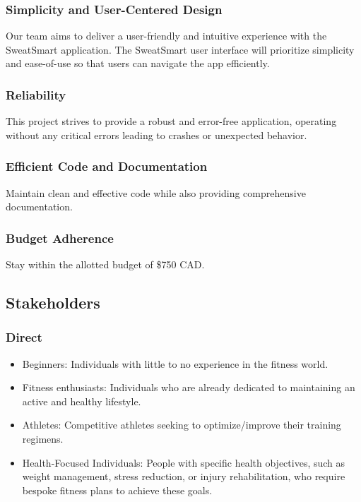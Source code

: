 \documentclass[12pt]{article}
\begin{document}
\subsubsection{Simplicity and User-Centered Design}
Our team aims to deliver a user-friendly and intuitive experience with the SweatSmart application. The SweatSmart user interface will prioritize simplicity and ease-of-use so that users can navigate the app efficiently.

\subsubsection{Reliability}
This project strives to provide a robust and error-free application, operating without any critical errors leading to crashes or unexpected behavior.

\subsubsection{Efficient Code and Documentation}
Maintain clean and effective code while also providing comprehensive documentation.

\subsubsection{Budget Adherence}
Stay within the allotted budget of \$750 CAD.

\subsection{Stakeholders}

\subsubsection{Direct}
\begin{itemize}
  \item Beginners: Individuals with little to no experience in the fitness world.
  \item Fitness enthusiasts: Individuals who are already dedicated to maintaining an active and healthy lifestyle.
  \item Athletes: Competitive athletes seeking to optimize/improve their training regimens.
  \item Health-Focused Individuals: People with specific health objectives, such as weight management, stress reduction, or injury rehabilitation, who require bespoke fitness plans to achieve these goals.
\end{itemize}
\end{document}
